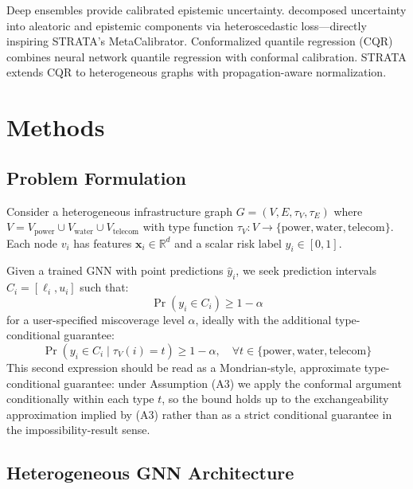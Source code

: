 \documentclass[twoside,11pt]{article}
\begin{document}
Deep ensembles \citep{lakshminarayanan2017simple} provide calibrated epistemic
uncertainty. \citet{kendall2017uncertainties} decomposed uncertainty into
aleatoric and epistemic components via heteroscedastic loss---directly inspiring
STRATA's MetaCalibrator. Conformalized quantile regression (CQR)
\citep{romano2019conformalized} combines neural network quantile regression
\citep{koenker1978regression} with conformal calibration. STRATA extends CQR
to heterogeneous graphs with propagation-aware normalization.

\section{Methods}
\label{sec:methods}

\subsection{Problem Formulation}

Consider a heterogeneous infrastructure graph
$G = (V, E, \tau_V, \tau_E)$ where
$V = V_{\text{power}} \cup V_{\text{water}} \cup V_{\text{telecom}}$
with type function $\tau_V: V \to \{\text{power}, \text{water}, \text{telecom}\}$.
Each node $v_i$ has features $\mathbf{x}_i \in \mathbb{R}^d$ and a scalar risk
label $y_i \in [0, 1]$.

Given a trained GNN with point predictions $\hat{y}_i$, we seek prediction
intervals $C_i = [\ell_i, u_i]$ such that:
\begin{equation}
\Pr(y_i \in C_i) \geq 1 - \alpha
\end{equation}
for a user-specified miscoverage level $\alpha$, ideally with the additional
type-conditional guarantee:
\begin{equation}
\Pr(y_i \in C_i \mid \tau_V(i) = t) \geq 1 - \alpha, \quad
\forall t \in \{\text{power}, \text{water}, \text{telecom}\}
\end{equation}
This second expression should be read as a Mondrian-style, approximate
type-conditional guarantee: under Assumption (A3) we apply the conformal
argument conditionally within each type $t$, so the bound holds up to the
exchangeability approximation implied by (A3) rather than as a strict
conditional guarantee in the impossibility-result sense.

\subsection{Heterogeneous GNN Architecture}
\end{document}
